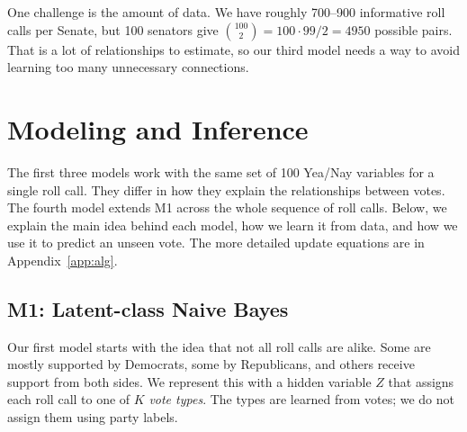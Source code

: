 \documentclass[10pt]{article}
\begin{document}
One challenge is the amount of data. We have roughly 700--900 informative roll calls per Senate, but 100 senators give $\binom{100}{2}=100\cdot99/2=4950$ possible pairs. That is a lot of relationships to estimate, so our third model needs a way to avoid learning too many unnecessary connections.

\section{Modeling and Inference}
The first three models work with the same set of 100 Yea/Nay variables for a single roll call. They differ in how they explain the relationships between votes. The fourth model extends M1 across the whole sequence of roll calls. Below, we explain the main idea behind each model, how we learn it from data, and how we use it to predict an unseen vote. The more detailed update equations are in Appendix~\ref{app:alg}.

\subsection{M1: Latent-class Naive Bayes}
Our first model starts with the idea that not all roll calls are alike. Some are mostly supported by Democrats, some by Republicans, and others receive support from both sides. We represent this with a hidden variable $Z$ that assigns each roll call to one of $K$ \emph{vote types}. The types are learned from votes; we do not assign them using party labels.
\end{document}
